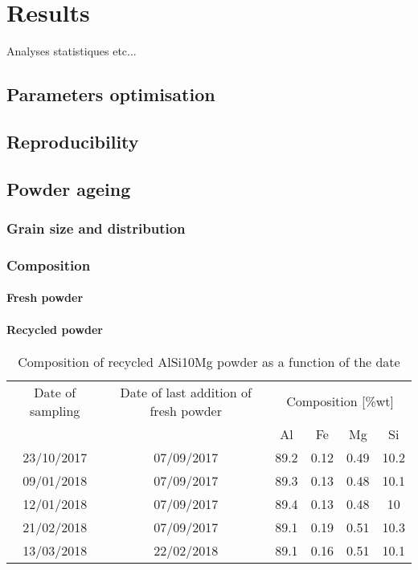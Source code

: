 \chapter{Results}
\label{Chap4}
Analyses statistiques etc...
\section{Parameters optimisation}

\section{Reproducibility}

\section{Powder ageing}

\subsection{Grain size and distribution}

\subsection{Composition}

\subsubsection{Fresh powder}

\subsubsection{Recycled powder}
 \begin{center}
\begin{table}[ht]
\begin{tabular}{|c|c |c |c| c|c|}
    \hline
    Date of sampling& Date of last addition of fresh powder & \multicolumn{4}{c}{Composition [\%wt]} \vline\\
    \cline{3-6}
    & & Al& Fe&Mg&Si\\
\hline 
\hline   
    23/10/2017 & 07/09/2017 &89.2&0.12&0.49&10.2\\
    09/01/2018 & 07/09/2017 & 89.3 & 0.13 &0.48&10.1\\
    12/01/2018 & 07/09/2017 & 89.4 & 0.13 &0.48&10\\
    21/02/2018& 07/09/2017 &89.1&0.19&0.51&10.3\\
    13/03/2018& 22/02/2018 &89.1&0.16&0.51&10.1\\    
    \hline
\end{tabular}

\caption[Composition of recycled AlSi10Mg powder as a function of the date]{Composition of recycled AlSi10Mg powder as a function of the date}
\label{tab:compo}
\end{table}
 \end{center}

